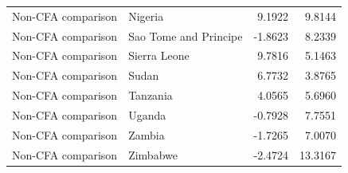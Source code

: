 \begin{table}
\begin{tabular}[t]{llrr}
Non-CFA comparison & Nigeria & 9.1922 & 9.8144\\
Non-CFA comparison & Sao Tome and Principe & -1.8623 & 8.2339\\
Non-CFA comparison & Sierra Leone & 9.7816 & 5.1463\\
\addlinespace
Non-CFA comparison & Sudan & 6.7732 & 3.8765\\
Non-CFA comparison & Tanzania & 4.0565 & 5.6960\\
Non-CFA comparison & Uganda & -0.7928 & 7.7551\\
Non-CFA comparison & Zambia & -1.7265 & 7.0070\\
Non-CFA comparison & Zimbabwe & -2.4724 & 13.3167\\
\bottomrule
\end{tabular}
\end{table}